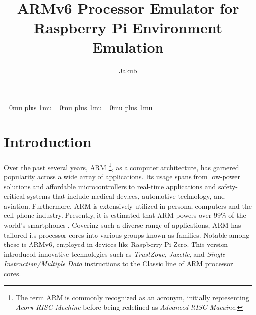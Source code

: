 \documentclass[english, ing, kiv, he, iso690numb, pdf]{fasthesis}
\title{ARMv6 Processor Emulator for Raspberry Pi Environment Emulation}
\author{Jakub}{Šilhavý}{Bc.}{}
\begin{document}
	\frontpages[tm] %
	
	\setcounter{tocdepth}{3}
	\tableofcontents
	
	\makeatletter%
	\ifx\FASThesis@style\c@fullcolor%
	\else%
	\fi%
	\makeatother%
	
	\setcounter{biburllcpenalty}{100}
	\setcounter{biburlucpenalty}{100}
	\setcounter{biburlnumpenalty}{100}
	
	\biburlnumskip=0mu plus 1mu\relax
	\biburlucskip=0mu plus 1mu\relax
	\biburllcskip=0mu plus 1mu\relax
	
	\chapter{Introduction}
	
	Over the past several years, ARM \footnote{The term ARM is commonly recognized as an acronym, initially representing \textit{Acorn RISC Machine} before being redefined as \textit{Advanced RISC Machine}.}, as a computer architecture, has garnered popularity across a wide array of applications. Its usage spans from low-power solutions and affordable microcontrollers to real-time applications and safety-critical systems that include medical devices, automotive technology, and aviation. Furthermore, ARM is extensively utilized in personal computers and the cell phone industry. Presently, it is estimated that ARM powers over 99\% of the world's smartphones \cite{ARM-history}. Covering such a diverse range of applications, ARM has tailored its processor cores into various groups known as families. Notable among these is ARMv6, employed in devices like Raspberry Pi Zero. This version introduced innovative technologies such as \textit{TrustZone}, \textit{Jazelle}, and \textit{Single Instruction/Multiple Data} instructions to the Classic line of ARM processor cores.
	
\end{document}
